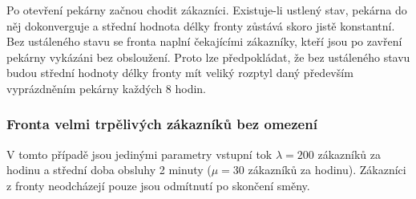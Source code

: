 \documentclass[a4paper,12pt]{article}
\begin{document}
Po otevření pekárny začnou chodit zákazníci. Existuje-li ustlený stav, pekárna do něj dokonverguje a střední hodnota délky fronty 
zůstává skoro jistě konstantní. Bez ustáleného stavu se fronta naplní čekajícími zákazníky, kteří jsou po zavření pekárny vykázáni 
bez obsloužení. Proto lze předpokládat, že bez ustáleného stavu budou střední hodnoty délky fronty mít veliký rozptyl daný především
vyprázdněním pekárny každých 8 hodin. 

\subsubsection{Fronta velmi trpělivých zákazníků bez omezení}
V tomto případě jsou jedinými parametry vstupní tok \(\lambda = 200\) zákazníků za hodinu a 
střední doba obsluhy 2 minuty (\(\mu = 30\) zákazníků za hodinu). Zákazníci z fronty neodcházejí 
pouze jsou odmítnutí po skončení směny. 
\end{document}
